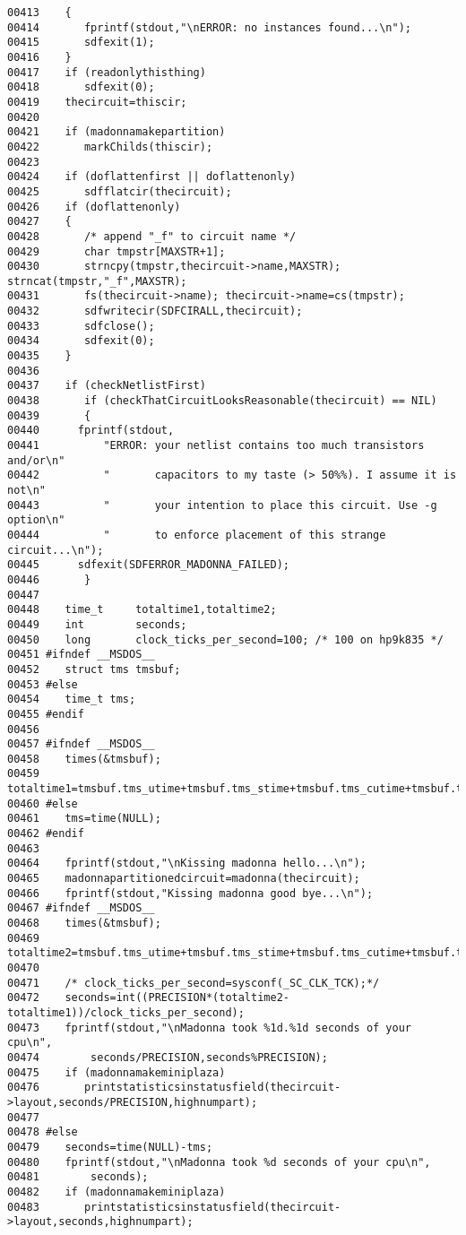 \begin{verbatim}
00413    {
00414       fprintf(stdout,"\nERROR: no instances found...\n");
00415       sdfexit(1);
00416    }
00417    if (readonlythisthing)
00418       sdfexit(0);
00419    thecircuit=thiscir;
00420    
00421    if (madonnamakepartition)
00422       markChilds(thiscir);
00423    
00424    if (doflattenfirst || doflattenonly)
00425       sdfflatcir(thecircuit);
00426    if (doflattenonly)
00427    {
00428       /* append "_f" to circuit name */
00429       char tmpstr[MAXSTR+1];
00430       strncpy(tmpstr,thecircuit->name,MAXSTR); strncat(tmpstr,"_f",MAXSTR);
00431       fs(thecircuit->name); thecircuit->name=cs(tmpstr);
00432       sdfwritecir(SDFCIRALL,thecircuit);
00433       sdfclose();
00434       sdfexit(0);
00435    }
00436 
00437    if (checkNetlistFirst)
00438       if (checkThatCircuitLooksReasonable(thecircuit) == NIL)
00439       {
00440      fprintf(stdout,
00441          "ERROR: your netlist contains too much transistors and/or\n"
00442          "       capacitors to my taste (> 50%%). I assume it is not\n"
00443          "       your intention to place this circuit. Use -g option\n"
00444          "       to enforce placement of this strange circuit...\n");
00445      sdfexit(SDFERROR_MADONNA_FAILED);
00446       }
00447 
00448    time_t     totaltime1,totaltime2;
00449    int        seconds;
00450    long       clock_ticks_per_second=100; /* 100 on hp9k835 */
00451 #ifndef __MSDOS__
00452    struct tms tmsbuf;
00453 #else
00454    time_t tms;
00455 #endif
00456    
00457 #ifndef __MSDOS__
00458    times(&tmsbuf);
00459    totaltime1=tmsbuf.tms_utime+tmsbuf.tms_stime+tmsbuf.tms_cutime+tmsbuf.tms_cstime;
00460 #else
00461    tms=time(NULL);
00462 #endif
00463    
00464    fprintf(stdout,"\nKissing madonna hello...\n");
00465    madonnapartitionedcircuit=madonna(thecircuit);
00466    fprintf(stdout,"Kissing madonna good bye...\n");
00467 #ifndef __MSDOS__
00468    times(&tmsbuf);
00469    totaltime2=tmsbuf.tms_utime+tmsbuf.tms_stime+tmsbuf.tms_cutime+tmsbuf.tms_cstime;
00470    
00471    /* clock_ticks_per_second=sysconf(_SC_CLK_TCK);*/
00472    seconds=int((PRECISION*(totaltime2-totaltime1))/clock_ticks_per_second);
00473    fprintf(stdout,"\nMadonna took %1d.%1d seconds of your cpu\n",
00474        seconds/PRECISION,seconds%PRECISION);
00475    if (madonnamakeminiplaza)
00476       printstatisticsinstatusfield(thecircuit->layout,seconds/PRECISION,highnumpart);
00477    
00478 #else
00479    seconds=time(NULL)-tms;
00480    fprintf(stdout,"\nMadonna took %d seconds of your cpu\n",
00481        seconds);
00482    if (madonnamakeminiplaza)
00483       printstatisticsinstatusfield(thecircuit->layout,seconds,highnumpart);

\end{verbatim}
